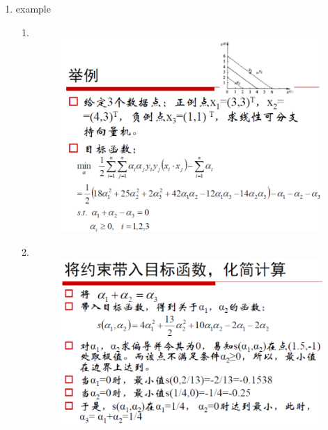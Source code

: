\documentclass[oneside, 12pt]{ctexbook}
\begin{document}
\begin{enumerate}
					\item example
						\begin{enumerate}[]
							\item 						
								\begin{figure}[H]
									\vspace{-0.2cm}  %
									\setlength{\abovecaptionskip}{-0.2cm}   %
									\centering
									\includegraphics[scale=0.7]{separable_dataset_svm_example1.png}
									\renewcommand{\figurename}{Fig} %
								\end{figure}
							
							\item 
								\begin{figure}[H]
									\vspace{-0.2cm}  %
									\setlength{\abovecaptionskip}{-0.2cm}   %
									\centering
									\includegraphics[scale=0.7]{separable_dataset_svm_example2.png}
									\renewcommand{\figurename}{Fig} %
								\end{figure}
							

\end{enumerate}
\end{enumerate}
\end{document}
